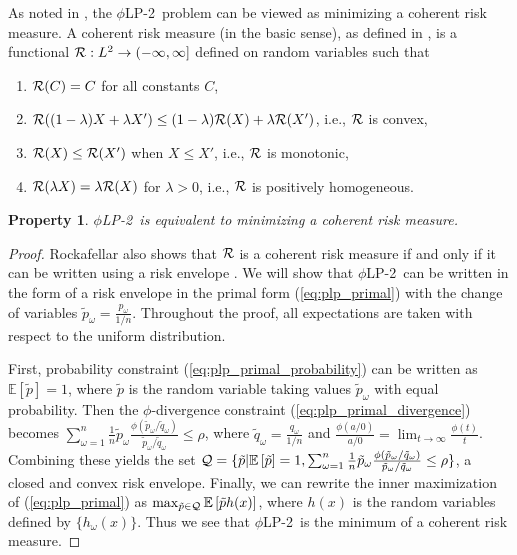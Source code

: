 \documentclass[ijoc,nonblindrev]{informs3} %
\newcommand{\E}{\mathbb{E}}
\newcommand{\e}[1]{\E \left[ #1 \right]}
\newtheorem{property}[theorem]{Property}
\newcommand{\plp}{$\phi$LP-2}
\begin{document}
As noted in \cite{wang2010likelihood}, the \plp\ problem can be viewed as minimizing a coherent risk measure.
A coherent risk measure (in the basic sense), as defined in \cite{rockafellar2007coherent}, is a functional ${\cal R}: L^2 \rightarrow (-\infty,\infty]$ defined on random variables such that
\begin{enumerate}
	\item ${\cal R}(C) = C$ for all constants $C$,
	\item ${\cal R}((1-\lambda)X + \lambda X') \leq (1-\lambda){\cal R}(X) + \lambda {\cal R}(X')$, i.e., $\cal R$ is convex,
	\item ${\cal R}(X) \leq {\cal R}(X')$ when $X \leq X'$, i.e., $\cal R$ is monotonic,
	\item ${\cal R}(\lambda X) = \lambda {\cal R}(X)$ for $\lambda > 0$, i.e., $\cal R$ is positively homogeneous.
\end{enumerate}

\begin{property}
	\plp\ is equivalent to minimizing a coherent risk measure.
\end{property}

\begin{proof}
	Rockafellar also shows that $\cal R$ is a coherent risk measure if and only if it can be written using a risk envelope \cite{rockafellar2007coherent}.
	We will show that \plp\ can be written in the form of a risk envelope in the primal form (\ref{eq:plp_primal}) with the change of variables $\tilde{p}_\omega = \frac{p_\omega}{1/n}$.
	Throughout the proof, all expectations are taken with respect to the uniform distribution.
	
	First, probability constraint (\ref{eq:plp_primal_probability}) can be written as $\e{\tilde{p}} = 1$, where $\tilde{p}$ is the random variable taking values $\tilde{p}_\omega$ with equal probability.
	Then the $\phi$-divergence constraint (\ref{eq:plp_primal_divergence}) becomes $\sum_{\omega=1}^n \frac{1}{n} \tilde{p}_\omega \frac{\phi\left(\tilde{p}_\omega/\tilde{q}_\omega\right)}{\tilde{p}_\omega/\tilde{q}_\omega} \leq \rho$, where $\tilde{q}_\omega = \frac{q_\omega}{1/n}$ and $\frac{\phi(a/0)}{a/0} = \lim_{t \rightarrow \infty} \frac{\phi(t)}{t}$.
	Combining these yields the set ${\cal Q} = \{\tilde{p} | \e{\tilde{p}} = 1, \sum_{\omega=1}^n \frac{1}{n} \tilde{p}_\omega \frac{\phi\left(\tilde{p}_\omega/\tilde{q}_\omega\right)}{\tilde{p}_\omega/\tilde{q}_\omega} \leq \rho \}$, a closed and convex risk envelope.
	Finally, we can rewrite the inner maximization of (\ref{eq:plp_primal}) as $\max_{\tilde{p} \in {\cal Q}} \e{\tilde{p} h(x)}$, where $h(x)$ is the random variables defined by $\{h_\omega(x)\}$.
	Thus we see that \plp\ is the minimum of a coherent risk measure.
\end{proof}
\end{document}
